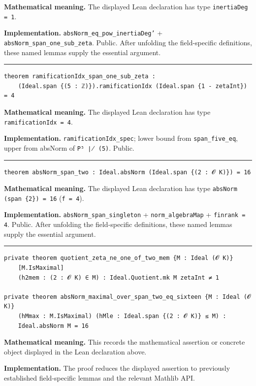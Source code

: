 \documentclass[UTF8,a4paper,11pt,fontset=fandol]{ctexart}
\theoremstyle{definition}
\newcommand{\statementsep}{\par\medskip\hrule\medskip}
\begin{document}
\noindent\textbf{Mathematical meaning.} The displayed Lean declaration has type \texttt{inertiaDeg = 1}.\par
\noindent\textbf{Implementation.} \texttt{absNorm\_\allowbreak{}eq\_\allowbreak{}pow\_\allowbreak{}inertiaDeg'} + \texttt{absNorm\_\allowbreak{}span\_\allowbreak{}one\_\allowbreak{}sub\_\allowbreak{}zeta}. Public. After unfolding the field-specific definitions, these named lemmas supply the essential argument.\par
\statementsep
\begin{verbatim}
theorem ramificationIdx_span_one_sub_zeta :
    (Ideal.span {(5 : ℤ)}).ramificationIdx (Ideal.span {1 - zetaInt}) = 4
\end{verbatim}
\noindent\textbf{Mathematical meaning.} The displayed Lean declaration has type \texttt{ramificationIdx = 4}.\par
\noindent\textbf{Implementation.} \texttt{ramificationIdx\_\allowbreak{}spec}; lower bound from \texttt{span\_\allowbreak{}five\_\allowbreak{}eq}, upper from absNorm of \texttt{P⁵ ∤ (5)}. Public.\par
\statementsep
\begin{verbatim}
theorem absNorm_span_two : Ideal.absNorm (Ideal.span {(2 : 𝓞 K)}) = 16
\end{verbatim}
\noindent\textbf{Mathematical meaning.} The displayed Lean declaration has type \texttt{absNorm (span \{2\}) = 16} (\texttt{f = 4}).\par
\noindent\textbf{Implementation.} \texttt{absNorm\_\allowbreak{}span\_\allowbreak{}singleton} + \texttt{norm\_\allowbreak{}algebraMap} + \texttt{finrank = 4}. Public. After unfolding the field-specific definitions, these named lemmas supply the essential argument.\par
\statementsep
\begin{verbatim}
private theorem quotient_zeta_ne_one_of_two_mem {M : Ideal (𝓞 K)}
    [M.IsMaximal]
    (h2mem : (2 : 𝓞 K) ∈ M) : Ideal.Quotient.mk M zetaInt ≠ 1

private theorem absNorm_maximal_over_span_two_eq_sixteen {M : Ideal (𝓞 K)}
    (hMmax : M.IsMaximal) (hMle : Ideal.span {(2 : 𝓞 K)} ≤ M) :
    Ideal.absNorm M = 16
\end{verbatim}
\noindent\textbf{Mathematical meaning.} This records the mathematical assertion or concrete object displayed in the Lean declaration above.\par
\noindent\textbf{Implementation.} The proof reduces the displayed assertion to previously established field-specific lemmas and the relevant Mathlib API.\par
\end{document}
